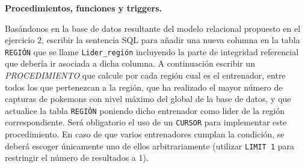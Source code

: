 \documentclass[12pt,a4paper,addpoints,answers]{exam}
\begin{document}
\begin{questions}

\newpage
\question[1\half] \textbf{Procedimientos, funciones y triggers.}

Basándonos en la base de datos resultante del modelo relacional propuesto en el ejercicio 2, escribir la sentencia SQL para añadir una nueva columna en la tabla \texttt{REGIÓN} que se llame \texttt{Lider\_región} incluyendo la parte de integridad referencial que debería ir asociada a dicha columna. A continuación escribir un \emph{PROCEDIMIENTO} que calcule por cada región cual es el entrenador, entre todos los que pertenezcan a la región, que ha realizado el mayor número de capturas de pokemons con nivel máximo del global de la base de datos, y que actualice la tabla \texttt{REGIÓN} poniendo dicho entrenador como lider de la región correspondiente. Será obligatorio el uso de un \texttt{CURSOR} para implementar este procedimiento. En caso de que varios entrenadores cumplan la condición, se deberá escoger únicamente uno de ellos arbitrariamente (utilizar \texttt{LIMIT 1} para restringir el número de resultados a 1).
        

\end{questions}
\end{document}
